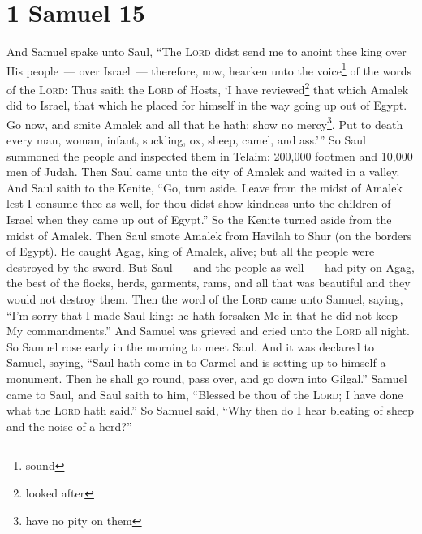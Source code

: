 \section{1 Samuel 15}\label{1 Samuel 15}
\begin{enumerate}
     And Samuel spake unto Saul, ``The \textsc{Lord} didst send me to anoint thee king over His people~--- over Israel~--- therefore, now, hearken unto the voice\footnote{sound} of the words of the \textsc{Lord}:%
     Thus saith the \textsc{Lord} of Hosts, `I have reviewed\footnote{looked after} that which Amalek did to Israel, that which he placed for himself in the way going up out of Egypt.%
     Go now, and smite Amalek and all that he hath; show no mercy\footnote{have no pity on them}. Put to death every man, woman, infant, suckling, ox, sheep, camel, and ass.'''%
     So Saul summoned the people and inspected them in Telaim: 200,000 footmen and 10,000 men of Judah.%
     Then Saul came unto the city of Amalek and waited in a valley.%
     And Saul saith to the Kenite, ``Go, turn aside. Leave from the midst of Amalek lest I consume thee as well, for thou didst show kindness unto the children of Israel when they came up out of Egypt.'' So the Kenite turned aside from the midst of Amalek.%
     Then Saul smote Amalek from Havilah to Shur (on the borders of Egypt).%
     He caught Agag, king of Amalek, alive; but all the people were destroyed by the sword.%
     But Saul~--- and the people as well~--- had pity on Agag, the best of the flocks, herds, garments, rams, and all that was beautiful and they would not destroy them.%
     Then the word of the \textsc{Lord} came unto Samuel, saying,%
     ``I'm sorry that I made Saul king: he hath forsaken Me in that he did not keep My commandments.'' And Samuel was grieved and cried unto the \textsc{Lord} all night.%
     So Samuel rose early in the morning to meet Saul. And it was declared to Samuel, saying, ``Saul hath come in to Carmel and is setting up to himself a monument. Then he shall go round, pass over, and go down into Gilgal.''%
     Samuel came to Saul, and Saul saith to him, ``Blessed be thou of the \textsc{Lord}; I have done what the \textsc{Lord} hath said.''%
     So Samuel said, ``Why then do I hear bleating of sheep and the noise of a herd?''%

\end{enumerate}
